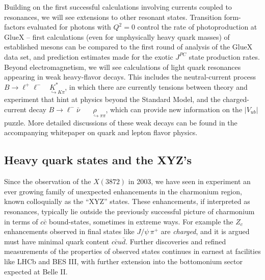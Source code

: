 Building on the first successful calculations involving currents coupled to resonances, we will see extensions to other resonant states. Transition form-factors evaluated for photons with $Q^2=0$ control the rate of photoproduction at GlueX -- first calculations (even for unphysically heavy quark masses) of established mesons can be compared to the first round of analysis of the GlueX data set, and prediction estimates made for the exotic $J^{PC}$ state production rates. Beyond electromagnetism, we will see calculations of light quark resonances appearing in weak heavy-flavor decays. This includes the neutral-current process $B \to \ell^+\ell^- \!\!\!\! \underset{\;\;\;\;\;\hookrightarrow K\pi}{K^*}$, in which there are currently tensions between theory and experiment that hint at physics beyond the Standard Model, and the charged-current decay $B \to \ell^-\bar{\nu}  \!\!\!\!\!\!\!\!\;\;\underset{\;\;\;\;\;\;\hookrightarrow \pi\pi}{\rho}$, which can provide new information on the $|V_{ub}|$ puzzle. More detailed discussions of these weak decays can be found in
the accompanying whitepaper on quark and lepton flavor physics.












\subsection{Heavy quark states and the XYZ's}

Since the observation of the $X(3872)$ in 2003, we have seen in experiment an ever growing family of unexpected enhancements in the charmonium region, known colloquially as the ``XYZ'' states. These enhancements, if interpreted as resonances, typically lie outside the previously successful picture of charmonium in terms of $c\bar{c}$ bound-states, sometimes in extreme ways. For example the $Z_c$ enhancements observed in final states like $J/\psi \, \pi^+$ are \emph{charged}, and it is argued must have minimal quark content $c\bar{c} u \bar{d}$. Further discoveries and refined measurements of the properties of observed states continues in earnest at facilities like LHCb and BES III, with further extension into the bottomonium sector expected at Belle II.

